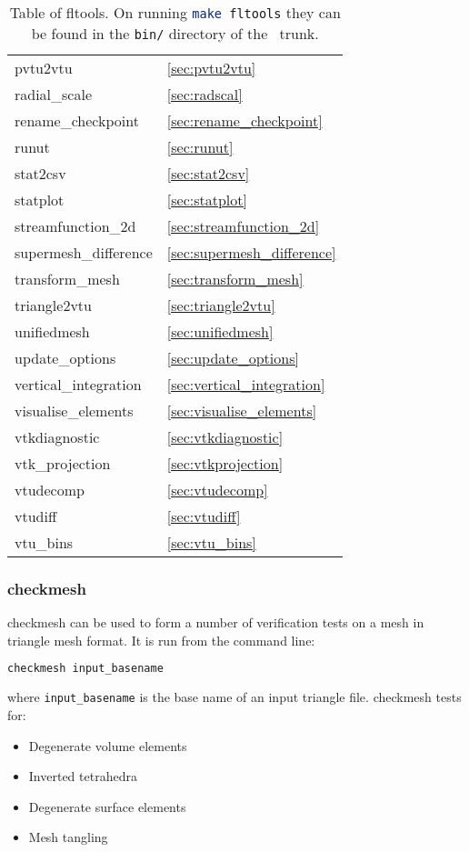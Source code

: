 \begin{table}
\begin{center}
\begin{tabular}{| l | l |}
	pvtu2vtu				& \ref{sec:pvtu2vtu}			\\
        radial\_scale                           & \ref{sec:radscal}                     \\
	rename\_checkpoint			& \ref{sec:rename_checkpoint}		\\
	runut           			& \ref{sec:runut}		        \\
	stat2csv				& \ref{sec:stat2csv}			\\
	statplot				& \ref{sec:statplot} 			\\
	streamfunction\_2d			& \ref{sec:streamfunction_2d} 		\\
	supermesh\_difference			& \ref{sec:supermesh_difference} 	\\
	transform\_mesh				& \ref{sec:transform_mesh}		\\
	triangle2vtu				& \ref{sec:triangle2vtu}		\\
	unifiedmesh				& \ref{sec:unifiedmesh} 		\\
	update\_options				& \ref{sec:update_options}		\\	
	vertical\_integration			& \ref{sec:vertical_integration} 	\\
    visualise\_elements     & \ref{sec:visualise_elements} \\ 
	vtkdiagnostic				& \ref{sec:vtkdiagnostic}		\\
	vtk\_projection				& \ref{sec:vtkprojection}		\\
	vtudecomp				& \ref{sec:vtudecomp}			\\
	vtudiff					& \ref{sec:vtudiff}			\\
	vtu\_bins           			& \ref{sec:vtu_bins}			\\
    \hline
  \end{tabular}
\end{center}
\caption[Table of fltools]{Table of fltools. On running \lstinline[language = bash]+make fltools+ they can be found in the \lstinline[language = bash]+bin/+ directory of the \fluidity\ trunk.}
\label{tab:fltools}
\end{table}


\subsubsection{checkmesh}
\label{sec:checkmesh}
checkmesh can be used to form a number of verification tests on a mesh in triangle mesh
format. It is run from the command line:
\begin{lstlisting}[language = Bash]
checkmesh input_basename
\end{lstlisting}
where \lstinline[language = Bash]+input_basename+ is the base name of an input triangle file. checkmesh tests for:
\begin{itemize}
\item Degenerate volume elements
\item Inverted tetrahedra
\item Degenerate surface elements
\item Mesh tangling
\end{itemize}

